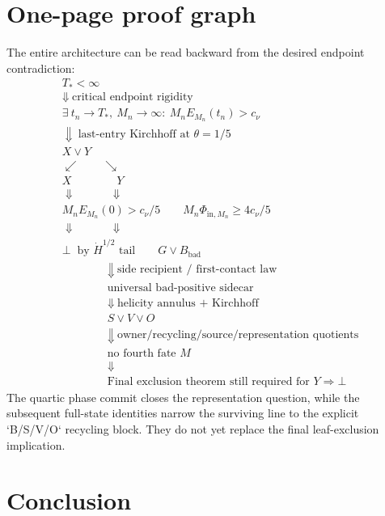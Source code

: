 \documentclass[11pt]{article}
\newcommand{\Hdot}{\dot H}
\begin{document}
\section{One-page proof graph}

The entire architecture can be read backward from the desired endpoint contradiction:
\[
\boxed{
\begin{array}{c}
T_*<\infty\\[2mm]
\Downarrow\ \text{critical endpoint rigidity}\\[2mm]
\exists\ t_n\to T_*,\ M_n\to\infty:\ M_nE_{M_n}(t_n)>c_\nu\\[2mm]
\Downarrow\ \text{last-entry Kirchhoff at }\theta=1/5\\[2mm]
X\vee Y\\[2mm]
\swarrow\qquad\searrow\\[-1mm]
X\qquad\qquad Y\\[1mm]
\Downarrow\qquad\quad\Downarrow\\[-1mm]
M_nE_{M_n}(0)>c_\nu/5
\qquad
M_n\Phi_{\mathrm{in},M_n}\ge4c_\nu/5\\[1mm]
\Downarrow\qquad\quad\Downarrow\\[-1mm]
\bot\ \text{ by }\Hdot^{1/2}\text{ tail}
\qquad
G\vee B_{\mathrm{bad}}\\[1mm]
\qquad\qquad\Downarrow\ \text{side recipient / first-contact law}\\[1mm]
\qquad\qquad\text{universal bad-positive sidecar}\\[1mm]
\qquad\qquad\Downarrow\ \text{helicity annulus + Kirchhoff}\\[1mm]
\qquad\qquad S\vee V\vee O\\[1mm]
\qquad\qquad\Downarrow\ \text{owner/recycling/source/representation quotients}\\[1mm]
\qquad\qquad\text{no fourth fate }M\\[1mm]
\qquad\qquad\Downarrow\\[1mm]
\qquad\qquad\boxed{\text{Final exclusion theorem still required for }Y\Rightarrow\bot}
\end{array}
}
\]
The quartic phase commit closes the representation question, while the subsequent full-state identities narrow the surviving line to the explicit `B/S/V/O` recycling block.  They do not yet replace the final leaf-exclusion implication.

\section{Conclusion}
\end{document}
